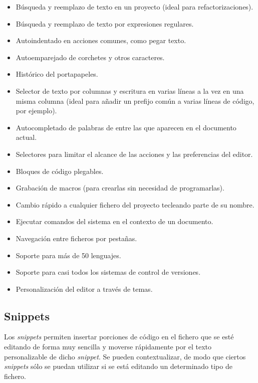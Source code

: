   \begin{itemize}
    \item Búsqueda y reemplazo de texto en un proyecto (ideal para refactorizaciones).
    \item Búsqueda y reemplazo de texto por expresiones regulares.
    \item Autoindentado en acciones comunes, como pegar texto.
    \item Autoemparejado de corchetes y otros caracteres.
    \item Histórico del portapapeles.
    \item Selector de texto por columnas y escritura en varias líneas a la vez en una misma columna (ideal para añadir un prefijo común a varias líneas de código, por ejemplo).
    \item Autocompletado de palabras de entre las que aparecen en el documento actual.
    \item Selectores para limitar el alcance de las acciones y las preferencias del editor.
    \item Bloques de código plegables.
    \item Grabación de macros (para crearlas sin necesidad de programarlas).
    \item Cambio rápido a cualquier fichero del proyecto tecleando parte de su nombre.
    \item Ejecutar comandos del sistema en el contexto de un documento.
    \item Navegación entre ficheros por pestañas.
    \item Soporte para más de 50 lenguajes.
    \item Soporte para casi todos los sistemas de control de versiones.
    \item Personalización del editor a través de temas.
  \end{itemize}

  \subsection{Snippets} %
    \label{sub:textmate_snippets}
  
    Los {\it snippets} permiten insertar porciones de código en el fichero que se esté editando de forma muy sencilla y moverse rápidamente por el texto personalizable de dicho {\it snippet}. Se pueden contextualizar, de modo que ciertos {\it snippets} sólo se puedan utilizar si se está editando un determinado tipo de fichero.

